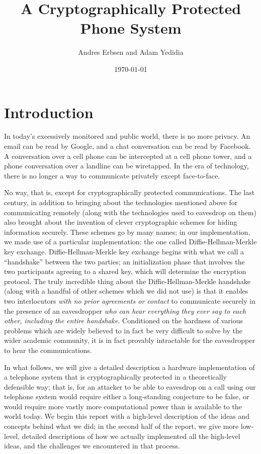 \documentclass[a4paper]{report}
\title{A Cryptographically Protected Phone System}
\author{Andres Erbsen and Adam Yedidia}
\date{\today}
\begin{document}
\maketitle

\section*{Introduction}

In today's excessively monitored and public world, there is no more privacy. An
email can be read by Google, and a chat conversation can be read by Facebook. A
conversation over a cell phone can be intercepted at a cell phone tower, and a
phone conversation over a landline can be wiretapped. In the era of technology,
there is no longer a way to communicate privately except face-to-face.

No way, that is, except for cryptographically protected communications. The last
century, in addition to bringing about the technologies mentioned above for
communicating remotely (along with the technologies used to eavesdrop on them)
also brought about the invention of clever cryptographic schemes for hiding
information securely. These schemes go by many names; in our implementation, we
made use of a particular implementation: the one called Diffie-Hellman-Merkle key
exchange. Diffie-Hellman-Merkle key exchange begins with what we call a ``handshake'' between the two parties; an initialization phase that involves the two participants agreeing to a shared key, which will %
determine the encryption protocol. The truly incredible thing about the Diffie-Hellman-Merkle handshake (along
with a handful of other schemes which we did not use) is that it enables two
interlocutors \emph{with no prior agreements or contact} to communicate securely
in the presence of an eavesdropper \emph{who can hear everything they ever say
to each other, including the entire handshake}. Conditioned on the hardness of various problems which are widely
believed to in fact be very difficult to solve by the wider academic community,
it is in fact provably intractable for the eavesdropper to hear the
communications.

In what follows, we will %
give a detailed description a hardware implementation of a telephone
system that is cryptographically protected in a theoretically defensible
way; that is, for an attacker to be able to eavesdrop on a call using our
telephone system would require either a long-standing conjecture to be false, or
would require more vastly more computational power than is available to the
world today. We begin this report with a high-level description of the ideas and concepts behind what we did; in the second half of the report, we give more low-level, detailed descriptions of how we actually implemented all the high-level ideas, and the challenges we encountered in that process.
\end{document}
